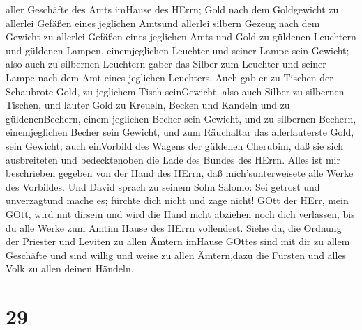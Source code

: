 aller Geschäfte des Amts imHause des HErrn;  Gold nach dem
Goldgewicht zu allerlei Gefäßen eines jeglichen Amtsund allerlei silbern
Gezeug nach dem Gewicht zu allerlei Gefäßen eines jeglichen Amts
 und Gold zu güldenen Leuchtern und güldenen Lampen,
einemjeglichen Leuchter und seiner Lampe sein Gewicht; also auch zu
silbernen Leuchtern gaber das Silber zum Leuchter und seiner Lampe nach
dem Amt eines jeglichen Leuchters.  Auch gab er zu Tischen
der Schaubrote Gold, zu jeglichem Tisch seinGewicht, also auch Silber zu
silbernen Tischen,  und lauter Gold zu Kreueln, Becken und
Kandeln und zu güldenenBechern, einem jeglichen Becher sein Gewicht, und
zu silbernen Bechern, einemjeglichen Becher sein Gewicht, 
und zum Räuchaltar das allerlauterste Gold, sein Gewicht; auch
einVorbild des Wagens der güldenen Cherubim, daß sie sich ausbreiteten
und bedecktenoben die Lade des Bundes des HErrn.  Alles ist
mir beschrieben gegeben von der Hand des HErrn, daß mich'sunterweisete
alle Werke des Vorbildes.  Und David sprach zu seinem Sohn
Salomo: Sei getrost und unverzagtund mache es; fürchte dich nicht und
zage nicht! GOtt der HErr, mein GOtt, wird mit dirsein und wird die Hand
nicht abziehen noch dich verlassen, bis du alle Werke zum Amtim Hause
des HErrn vollendest.  Siehe da, die Ordnung der Priester
und Leviten zu allen Ämtern imHause GOttes sind mit dir zu allem
Geschäfte und sind willig und weise zu allen Ämtern,dazu die Fürsten und
alles Volk zu allen deinen Händeln.

\hypertarget{section-28}{%
\section{29}\label{section-28}}

